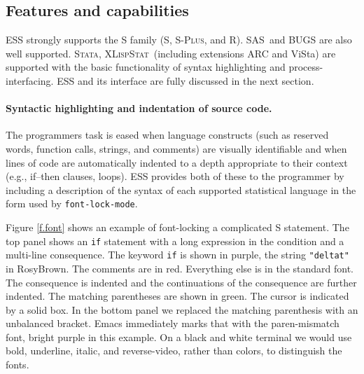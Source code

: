 \documentclass{article}
\newcommand*{\SAS}{\textsc{SAS}}
\newcommand*{\Splus}{\textsc{S-Plus}}
\newcommand*{\XLispStat}{\textsc{XLispStat}}
\newcommand*{\Stata}{\textsc{Stata}}
\newcommand{\stexttt}[1]{{\small\texttt{#1}}}
\begin{document}


\subsection{Features and capabilities}
\label{sec:ESS:features}

ESS strongly supports the S family (S, \Splus, and R)\@.  \SAS\ and
BUGS are also well supported.  \Stata, \XLispStat\ (including
extensions ARC and ViSta) are supported with the basic functionality
of syntax highlighting and process-interfacing.  ESS and its interface
are fully discussed in the next section.

\paragraph{Syntactic highlighting and indentation of source code.}
The programmers task is eased when language constructs (such as
reserved words, function calls, strings, and comments) are visually
identifiable and when lines of code are automatically indented to a
depth appropriate to their context (e.g., if--then clauses, loops).
ESS provides both of these to the programmer by including a
description of the syntax of each supported statistical language in
the form used by \stexttt{font-lock-mode}.

Figure \ref{f.font} shows an example of font-locking a complicated S
statement.  The top panel shows an \stexttt{if} statement with a long
expression in the condition and a multi-line consequence.  The keyword
\stexttt{if} is shown in purple, the string \stexttt{"deltat"} in
RosyBrown.  The comments are in red.  Everything else is in the
standard font.  The consequence is indented and the continuations of
the consequence are further indented.  The matching parentheses are
shown in green.  The cursor is indicated by a solid box.  In the
bottom panel we replaced the matching parenthesis with an unbalanced
bracket.  Emacs immediately marks that with the paren-mismatch font,
bright purple in this example.  On a black and white terminal we would
use bold, underline, italic, and reverse-video, rather than colors, to
distinguish the fonts.
\end{document}
